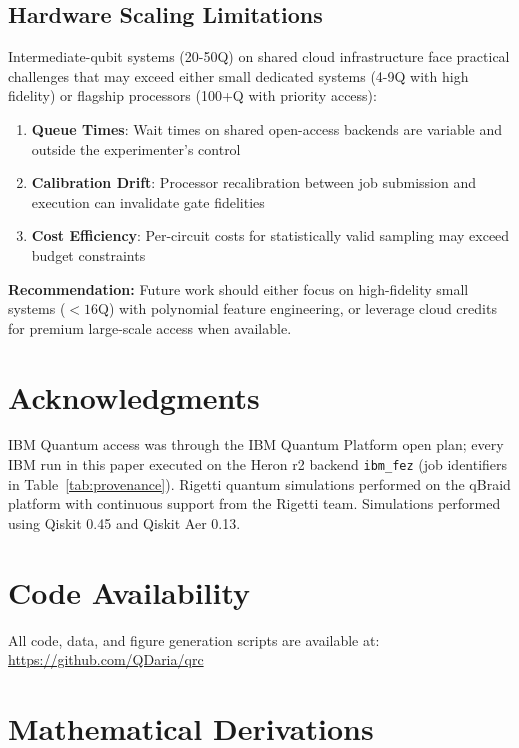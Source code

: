 \documentclass[conference]{IEEEtran}
\begin{document}
\subsection{Hardware Scaling Limitations}

Intermediate-qubit systems (20-50Q) on shared cloud infrastructure face practical challenges that may exceed either small dedicated systems (4-9Q with high fidelity) or flagship processors (100+Q with priority access):

\begin{enumerate}
    \item \textbf{Queue Times}: Wait times on shared open-access backends are variable and outside the experimenter's control
    \item \textbf{Calibration Drift}: Processor recalibration between job submission and execution can invalidate gate fidelities
    \item \textbf{Cost Efficiency}: Per-circuit costs for statistically valid sampling may exceed budget constraints
\end{enumerate}

\textbf{Recommendation:} Future work should either focus on high-fidelity small systems ($<16$Q) with polynomial feature engineering, or leverage cloud credits for premium large-scale access when available.

\section*{Acknowledgments}

IBM Quantum access was through the IBM Quantum Platform open plan; every IBM run in this paper executed on the Heron r2 backend \texttt{ibm\_fez} (job identifiers in Table~\ref{tab:provenance}). Rigetti quantum simulations performed on the qBraid platform with continuous support from the Rigetti team. Simulations performed using Qiskit 0.45 and Qiskit Aer 0.13.

\section*{Code Availability}

All code, data, and figure generation scripts are available at: \url{https://github.com/QDaria/qrc}

\appendices

\section{Mathematical Derivations}
\label{app:math_derivations}
\end{document}
